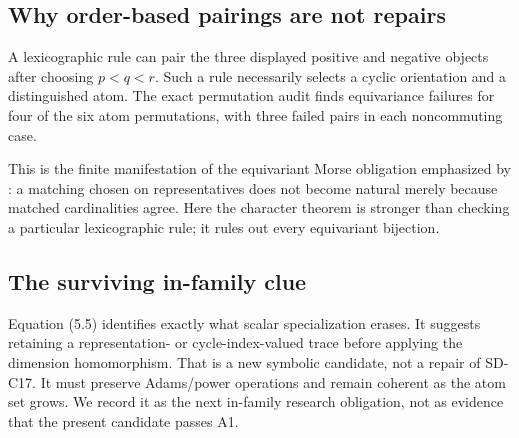 \subsection{Why order-based pairings are not repairs}

A lexicographic rule can pair the three displayed positive and negative
objects after choosing $p<q<r$.  Such a rule necessarily selects a cyclic
orientation and a distinguished atom.  The exact permutation audit finds
equivariance failures for four of the six atom permutations, with three
failed pairs in each noncommuting case.

This is the finite manifestation of the equivariant Morse obligation
emphasized by \citet{freij2009}: a matching chosen on representatives does
not become natural merely because matched cardinalities agree.  Here the
character theorem is stronger than checking a particular lexicographic rule;
it rules out every equivariant bijection.

\subsection{The surviving in-family clue}

Equation (5.5) identifies exactly what scalar specialization erases.  It
suggests retaining a representation- or cycle-index-valued trace before
applying the dimension homomorphism.  That is a new symbolic candidate, not a
repair of SD-C17.  It must preserve Adams/power operations and remain
coherent as the atom set grows.  We record it as the next in-family research
obligation, not as evidence that the present candidate passes A1.

